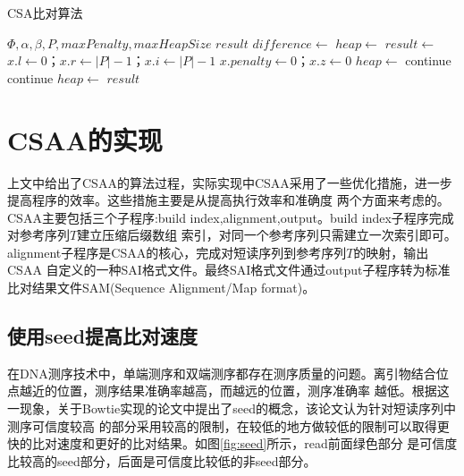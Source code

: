 \documentclass[UTF8,adobefonts]{ctexart}
\begin{document}
\begin{algorithm}
    \caption{CSA比对算法}
    \label{alg:alignment}
    \begin{algorithmic}[1]
        \Require $\Phi,\alpha,\beta,P,maxPenalty,maxHeapSize$
        \Ensure $result$    
        \State $difference\gets$
        \State $heap \gets$ 
        \State $result \gets$
        \State $x.l\gets 0$；$x.r\gets |P|-1$；$x.i\gets |P|-1$
        \State $x.penalty\gets 0$；$x.z\gets 0$
        \State $heap\gets$     
                \State {}    
                \State continue
            \EndIf
              
                \State continue
            \EndIf
            \State $heap\gets$ 
             
                \State {}
            \EndWhile
        \EndWhile
        \State \Return $result$    
        \EndFunction
    \end{algorithmic}
\end{algorithm}


\section{CSAA的实现}

上文中给出了CSAA的算法过程，实际实现中CSAA采用了一些优化措施，进一步提高程序的效率。这些措施主要是从提高执行效率和准确度
两个方面来考虑的。CSAA主要包括三个子程序:build index,alignment,output。build index子程序完成对参考序列$T$建立压缩后缀数组
索引，对同一个参考序列只需建立一次索引即可。alignment子程序是CSAA的核心，完成对短读序列到参考序列$T$的映射，输出CSAA
自定义的一种SAI格式文件。最终SAI格式文件通过output子程序转为标准比对结果文件SAM(Sequence Alignment/Map format)。

\subsection{使用seed提高比对速度}
在DNA测序技术中，单端测序和双端测序都存在测序质量的问题。离引物结合位点越近的位置，测序结果准确率越高，而越远的位置，测序准确率
越低。根据这一现象，关于Bowtie实现的论文\cite{langmead2009ultrafast}中提出了seed的概念，该论文认为针对短读序列中测序可信度较高
的部分采用较高的限制，在较低的地方做较低的限制可以取得更快的比对速度和更好的比对结果。如图\ref{fig:seed}所示，read前面绿色部分
是可信度比较高的seed部分，后面是可信度比较低的非seed部分。
\end{document}
